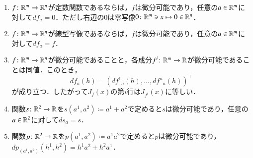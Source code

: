 \begin{prop}\label{微分の基本性質}
\leavevmode
\begin{enumerate}
\item $f \colon \mathbb{R}^m \to \mathbb{R}^n$が定数関数であるならば，$f$は微分可能であり，任意の$a \in \mathbb{R}^m$に対して$df_a = 0$．ただし右辺の$0$は零写像$0 \colon \mathbb{R}^m \ni x \mapsto 0 \in \mathbb{R}^n$．
\item $f \colon \mathbb{R}^m \to \mathbb{R}^n$が線型写像であるならば，$f$は微分可能であり，任意の$a \in \mathbb{R}^m$に対して$df_a = f$．
\item $f \colon \mathbb{R}^m \to \mathbb{R}^n$が微分可能であることと，各成分$f^i \colon \mathbb{R}^m \to \mathbb{R}$が微分可能であることは同値．このとき，
\begin{equation}
df_a(h) = (d{f^1}_a(h), \dots, d{f^n}_a(h))^\top
\end{equation}が成り立つ．したがって$J_f(x)$の第$i$行は$J_{f^i}(x)$に等しい．
\item 関数$s \colon \mathbb{R}^2 \to \mathbb{R}$を$s(a^1,a^2) \coloneqq a^1+a^2$で定めると$s$は微分可能であり，任意の$a \in \mathbb{R}^2$に対して$ds_a = s$．
\item 関数$p \colon \mathbb{R}^2 \to \mathbb{R}$を$p(a^1,a^2) \coloneqq a^1a^2$で定めると$p$は微分可能であり，$dp_{(a^1,a^2)}(h^1,h^2) = h^1a^2+h^2a^1$．
\end{enumerate}
\end{prop}


